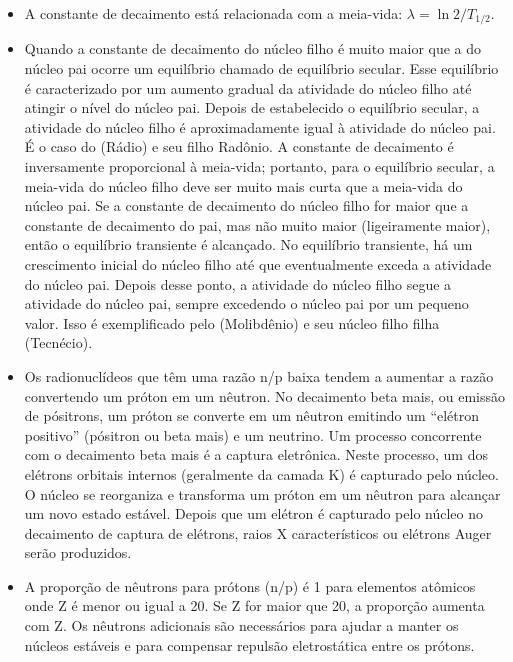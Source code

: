 \documentclass[11pt,a4paper]{article}
\newcounter{exemplo}
\begin{document}
\begin{exemplo}
\begin{itemize}
       \item A constante de decaimento está relacionada com a meia-vida: $\lambda = \ln 2 / T_{1/2}$.
       
       \item Quando a constante de decaimento do núcleo filho é muito maior que a do núcleo pai ocorre um equilíbrio chamado de equilíbrio secular. Esse equilíbrio é caracterizado por um aumento gradual da atividade do núcleo filho até atingir o nível do núcleo pai. Depois de estabelecido o equilíbrio secular, a atividade do núcleo filho é aproximadamente igual à atividade do núcleo pai. É o caso do  (Rádio) e seu filho  {Radônio}. A constante de decaimento é inversamente proporcional à meia-vida; portanto, para o equilíbrio secular, a meia-vida do núcleo filho deve ser muito mais curta que a meia-vida do núcleo pai. Se a constante de decaimento do núcleo filho for maior que a constante de decaimento do pai, mas não muito maior (ligeiramente maior), então o equilíbrio transiente é alcançado. No equilíbrio transiente, há um crescimento inicial do núcleo filho até que eventualmente exceda a atividade do núcleo pai. Depois desse ponto, a atividade do núcleo filho segue a atividade do núcleo pai, sempre excedendo o núcleo pai por um pequeno valor. Isso é exemplificado pelo  (Molibdênio) e seu núcleo filho filha  (Tecnécio). 
       
       \item Os radionuclídeos que têm uma razão n/p baixa tendem a aumentar a razão convertendo um próton em um nêutron. No decaimento beta mais, ou emissão de pósitrons, um próton se converte em um nêutron emitindo um ``elétron positivo'' (pósitron ou beta mais) e um neutrino. Um processo concorrente com o decaimento beta mais é a captura eletrônica. Neste processo, um dos elétrons orbitais internos (geralmente da camada K) é capturado pelo núcleo. O núcleo se reorganiza e transforma um próton em um nêutron para alcançar um novo estado estável. Depois que um elétron é capturado pelo núcleo no decaimento de captura de elétrons, raios X característicos ou elétrons Auger serão produzidos.
       
	   \item A proporção de nêutrons para prótons (n/p) é 1 para elementos atômicos onde Z é menor ou igual a 20. Se Z for maior que 20, a proporção aumenta com Z. Os nêutrons adicionais são necessários para ajudar a manter os núcleos estáveis e para compensar repulsão eletrostática entre os prótons.
	   

\end{itemize}
\end{exemplo}
\end{document}
